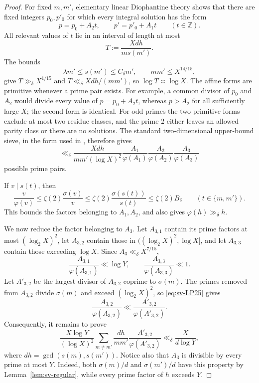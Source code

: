 \documentclass[11pt]{article}
\theoremstyle{remark}
\newcommand{\1}{\mathbf 1}
\begin{document}
\begin{proof}
For fixed $m,m'$, elementary linear Diophantine theory shows that there
are fixed integers $p_0,p'_0$ for which every integral solution has the form
\[
 p=p_0+A_2t,\qquad p'=p'_0+A_1t \qquad(t\in\mathbb Z).
\]
All relevant values of $t$ lie in an interval of length at most
\[
 T:=\frac{Xdh}{m s(m')}.
\]
The bounds
\[
 \lambda m'\leq s(m')\leq C_\delta m',
 \qquad mm'\leq X^{14/15},
\]
give $T\gg_\delta X^{1/15}$ and
$T\ll_\delta Xdh/(mm')$, so $\log T\asymp\log X$.  The affine forms are
primitive whenever a prime pair exists.  For example, a common divisor of
$p_0$ and $A_2$ would divide every value of $p=p_0+A_2t$, whereas
$p>A_2$ for all sufficiently large $X$; the second form is identical.
For odd primes the two primitive forms exclude at most two residue classes,
and the prime $2$ either leaves an allowed parity class or there are no
solutions.  The standard two-dimensional upper-bound sieve, in the form used in
\cite[(3.7)]{LucaPomerance}, therefore gives
\begin{equation}\label{eq:sv-two-prime-sieve}
 \ll_\delta
 \frac{Xdh}{mm'(\log X)^2}
 \frac{A_1}{\varphi(A_1)}
 \frac{A_2}{\varphi(A_2)}
 \frac{A_3}{\varphi(A_3)}
\end{equation}
possible prime pairs.

If $v\mid s(t)$, then
\begin{equation}\label{eq:sv-totient}
 \frac v{\varphi(v)}
 \leq\zeta(2)\frac{\sigma(v)}v
 \leq\zeta(2)\frac{\sigma(s(t))}{s(t)}
 \leq\zeta(2)B_\delta
 \qquad(t\in\{m,m'\}).
\end{equation}
This bounds the factors belonging to $A_1,A_2$, and also gives
$\varphi(h)\gg_\delta h$.

We now reduce the factor belonging to $A_3$.  Let $A_{3,1}$ contain its
prime factors at most $(\log_2X)^2$, let $A_{3,2}$ contain those in
$((\log_2X)^2,\log X]$, and let $A_{3,3}$ contain those exceeding
$\log X$.  Since $A_3\ll_\delta X^{7/15}$,
\[
 \frac{A_{3,1}}{\varphi(A_{3,1})}\ll\log Y,
 \qquad
 \frac{A_{3,3}}{\varphi(A_{3,3})}\ll1.
\]
Let $A'_{3,2}$ be the largest divisor of $A_{3,2}$ coprime to
$\sigma(m)$.  The primes removed from $A_{3,2}$ divide $\sigma(m)$ and
exceed $(\log_2X)^2$, so \eqref{eq:sv-LP25} gives
\[
 \frac{A_{3,2}}{\varphi(A_{3,2})}
 \ll\frac{A'_{3,2}}{\varphi(A'_{3,2})}.
\]
Consequently, it remains to prove
\begin{equation}\label{eq:sv-reduced-collision-sum}
 \frac{X\log Y}{(\log X)^2}
 \sum_{m\ne m'}
 \frac{dh}{mm'}
 \frac{A'_{3,2}}{\varphi(A'_{3,2})}
 \ll_\delta\frac{X}{d\log Y},
\end{equation}
where $dh=\gcd(s(m),s(m'))$.  Notice also that $A_3$ is divisible by every
prime at most $Y$.  Indeed, both $\sigma(m)/d$ and $\sigma(m')/d$ have this
property by Lemma~\ref{lem:sv-regular}, while every prime factor of $h$
exceeds $Y$.


\end{proof}
\end{document}
